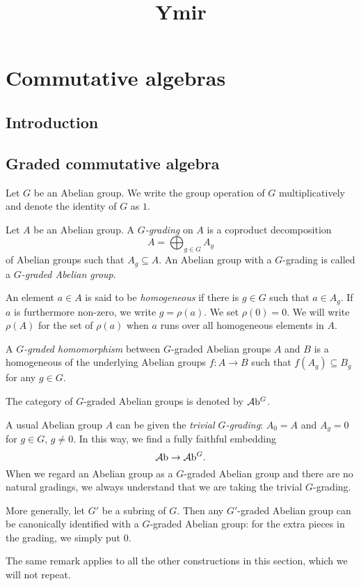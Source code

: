 
\title{Ymir}

\maketitle
\tableofcontents



\chapter*{Commutative algebras}\label{chap-commutative}


\section{Introduction}\label{sec-introduction}

\section{Graded commutative algebra}
Let $G$ be an Abelian group. We write the group operation of $G$ multiplicatively and denote the identity of $G$ as $1$.

\begin{definition}
    Let $A$ be an Abelian group. A \emph{$G$-grading} on $A$ is a coproduct decomposition
    \[
        A=\bigoplus_{g\in G}A_g  
    \]
    of Abelian groups such that $A_g\subseteq A$. An Abelian group with a $G$-grading is called a \emph{$G$-graded Abelian group}. 

    An element $a\in A$ is said to be \emph{homogeneous} if there is $g\in G$ such that $a\in A_g$. If $a$ is furthermore non-zero, we write $g=\rho(a)$. We set $\rho(0)=0$. We will write $\rho(A)$ for the set of $\rho(a)$ when $a$ runs over all homogeneous elements in $A$.

    A \emph{$G$-graded homomorphism} between $G$-graded Abelian groups $A$ and $B$ is a homogeneous of the underlying Abelian groups $f:A\rightarrow B$ such that $f(A_g)\subseteq B_g$ for any $g\in G$.

    The category of $G$-graded Abelian groups is denoted by $\mathcal{A}\mathrm{b}^G$.
\end{definition}
\begin{remark}
    A usual Abelian group $A$ can be given the \emph{trivial $G$-grading}: $A_0=A$ and $A_g=0$ for $g\in G$, $g\neq 0$. In this way, we find a fully faithful embedding 
    \[
        \mathcal{A}\mathrm{b}\rightarrow \mathcal{A}\mathrm{b}^G.  
    \]
    When we regard an Abelian group as a $G$-graded Abelian group and there are no natural gradings, we always understand that we are taking the trivial $G$-grading.
    
    More generally, let $G'$ be a subring of $G$. Then any $G'$-graded Abelian group can be canonically identified with a $G$-graded Abelian group: for the extra pieces in the grading, we simply put $0$.

    The same remark applies to all the other constructions in this section, which we will not repeat.
\end{remark}




